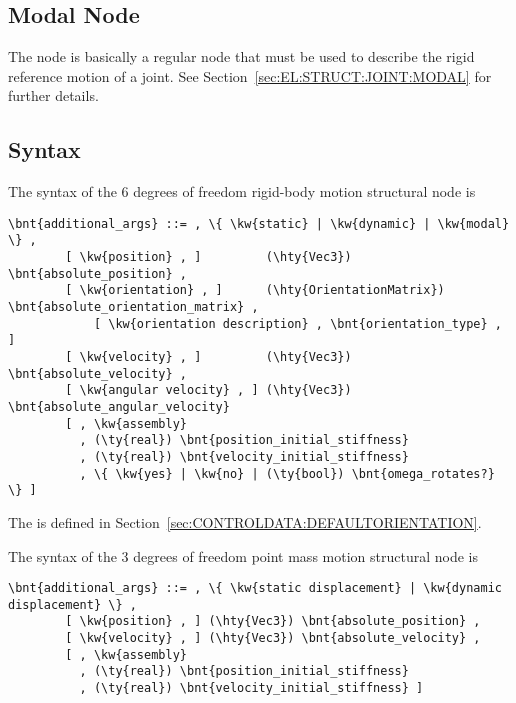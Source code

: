 \subsection{Modal Node}
\label{sec:NODE:STRUCTURAL:MODAL}
The  node is basically a regular  node
that must be used to describe the rigid reference motion
of a  joint.
See Section~\ref{sec:EL:STRUCT:JOINT:MODAL} for further details.

\subsection{Syntax}
\label{sec:NODE:STRUCTURAL:SYNTAX}
The syntax of the 6 degrees of freedom rigid-body motion structural node is
\begin{Verbatim}[commandchars=\\\{\}]
    \bnt{additional_args} ::= , \{ \kw{static} | \kw{dynamic} | \kw{modal} \} ,
        [ \kw{position} , ]         (\hty{Vec3})              \bnt{absolute_position} ,
        [ \kw{orientation} , ]      (\hty{OrientationMatrix}) \bnt{absolute_orientation_matrix} ,
            [ \kw{orientation description} , \bnt{orientation_type} , ]
        [ \kw{velocity} , ]         (\hty{Vec3})              \bnt{absolute_velocity} ,
        [ \kw{angular velocity} , ] (\hty{Vec3})              \bnt{absolute_angular_velocity}
        [ , \kw{assembly}
          , (\ty{real}) \bnt{position_initial_stiffness}
          , (\ty{real}) \bnt{velocity_initial_stiffness}
          , \{ \kw{yes} | \kw{no} | (\ty{bool}) \bnt{omega_rotates?} \} ]
\end{Verbatim}
The  is defined
in Section~\ref{sec:CONTROLDATA:DEFAULTORIENTATION}.

The syntax of the 3 degrees of freedom point mass motion structural node is
\begin{Verbatim}[commandchars=\\\{\}]
    \bnt{additional_args} ::= , \{ \kw{static displacement} | \kw{dynamic displacement} \} ,
        [ \kw{position} , ] (\hty{Vec3}) \bnt{absolute_position} ,
        [ \kw{velocity} , ] (\hty{Vec3}) \bnt{absolute_velocity} ,
        [ , \kw{assembly}
          , (\ty{real}) \bnt{position_initial_stiffness}
          , (\ty{real}) \bnt{velocity_initial_stiffness} ]
\end{Verbatim}

